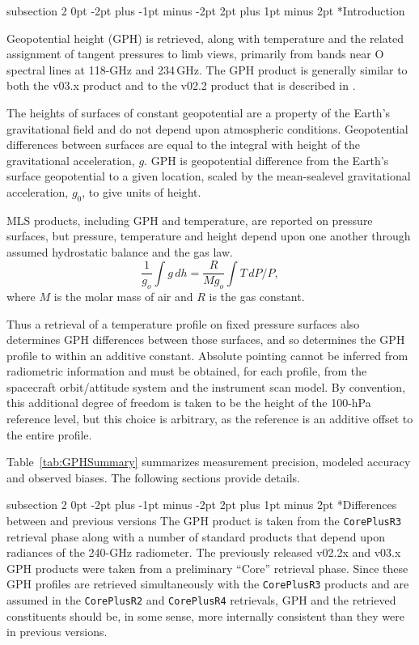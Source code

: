 \documentclass[11pt,draft]{report}
\makeatletter
\renewcommand{\subsection}{\@startsection%
  {subsection}%
  {2}%
  {0pt}%
  {-2pt plus -1pt minus -2pt}%
  {2pt plus 1pt minus 2pt}%
  {\large\sffamily\fontseries{sb}\selectfont\flushleft\color{SectionColor}\figureversion{tabular}}}%
\makeatother
\begin{document}
\subsection*{Introduction}

Geopotential height (GPH) is retrieved, along with temperature and the
related assignment of tangent pressures to limb views, primarily from
bands near O spectral lines at 118-GHz and 234\,GHz.  The \thisv GPH
product is generally similar to both the v03.x product and to the v02.2
product that is described in \citet{SchwartzEtal08}.

The heights of surfaces of constant geopotential are a property of the
Earth's gravitational field and do not depend upon atmospheric
conditions.  Geopotential differences between surfaces are equal to the
integral with height of the gravitational acceleration, $g$.  GPH is
geopotential difference from the Earth's surface geopotential to a given
location, scaled by the mean-sealevel gravitational acceleration, $g_0$,
to give units of height.

MLS products, including GPH and temperature, are reported on pressure
surfaces, but pressure, temperature and height depend upon one another
through assumed hydrostatic balance and the gas law.
\begin{equation}
\frac{1}{g_o} \int g\,dh = \frac{R}{M g_o}\int T\,dP/P,
\end{equation}
where $M$ is the molar mass of air and $R$ is the gas constant.

Thus a retrieval of a temperature profile on fixed pressure surfaces
also determines GPH differences between those surfaces, and so
determines the GPH profile to within an additive constant.  Absolute
pointing cannot be inferred from radiometric
information and must be obtained, for each profile, from the
spacecraft orbit/attitude system and the instrument scan model.  By
convention, this additional degree of freedom is taken to be the height
of the 100-hPa reference level, but this choice is arbitrary, as the
reference is an additive offset to the entire profile.

Table~\ref{tab:GPHSummary} summarizes \thisv measurement precision,
modeled accuracy and observed biases.  The following sections provide
details.

\subsection*{Differences between \thisv and previous versions}
The \thisv GPH product is taken from the \texttt{CorePlusR3} retrieval
phase along with a number of standard products that depend upon
radiances of the 240-GHz radiometer.  The previously released v02.2x and
v03.x GPH products were taken from a preliminary ``Core'' retrieval
phase.  Since these GPH profiles are retrieved simultaneously with the
\texttt{CorePlusR3} products and are assumed in the \texttt{CorePlusR2}
and \texttt{CorePlusR4} retrievals, GPH and the retrieved constituents
should be, in some sense, more internally consistent than they were in
previous versions.
\end{document}
